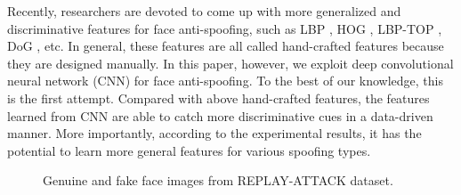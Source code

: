 \documentclass[letterpaper, 10 pt, conference]{ieeeconf}
\begin{document}
Recently, researchers are devoted to come up with more generalized and discriminative features for face anti-spoofing, such as LBP \cite{DBLP:conf/IJCB/Maatta}\cite{Face_Anti_Spoofing_JianweiYang_2013}, HOG \cite{komulainen2013context}\cite{Face_Anti_Spoofing_JianweiYang_2013}, LBP-TOP \cite{de2013lbp}, DoG \cite{Face_Anti_Spoofing_XiaoyangTan_ECCV_2010} \cite{DBLP:conf/icip/PeixotoMR11}, etc. In general, these features are all called hand-crafted features because they are designed manually. In this paper, however, we exploit deep convolutional neural network (CNN) for face anti-spoofing. To the best of our knowledge, this is the first attempt. Compared with above hand-crafted features, the features learned from CNN are able to catch more discriminative cues in a data-driven manner. More importantly, according to the experimental results, it has the potential to learn more general features for various spoofing types.

\begin{figure}
\begin{minipage}[b]{0.2\linewidth}
\centering
\centerline{}
\end{minipage}
\hfill
\begin{minipage}[b]{0.2\linewidth}
\centering
\centerline{}
\end{minipage}
\hfill
\begin{minipage}[b]{0.2\linewidth}
\centering
\centerline{}
\end{minipage}
\hfill
\begin{minipage}[b]{0.2\linewidth}
\centering
\centerline{}
\end{minipage}

\begin{minipage}[b]{0.2\linewidth}
\centering
\centerline{}
\end{minipage}
\hfill
\begin{minipage}[b]{0.2\linewidth}
\centering
\centerline{}
\end{minipage}
\hfill
\begin{minipage}[b]{0.2\linewidth}
\centering
\centerline{}
\end{minipage}
\hfill
\begin{minipage}[b]{0.2\linewidth}
\centering
\centerline{}
\end{minipage}
\caption{Genuine and fake face images from REPLAY-ATTACK dataset.}
\label{Fig_1}
\end{figure}
\end{document}
